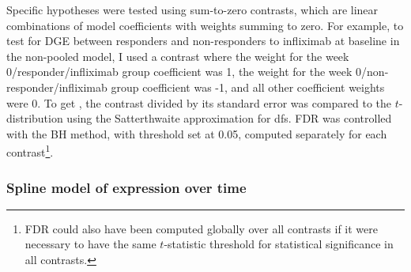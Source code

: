 Specific hypotheses were tested using sum-to-zero contrasts, which are linear combinations of model coefficients with weights summing to zero.
For example, 
to test for \gls{DGE} between responders and non-responders to infliximab at baseline in the non-pooled model,
I used a contrast where
the weight for the week 0/responder/infliximab group coefficient was 1,
the weight for the week 0/non-responder/infliximab group coefficient was -1,
and all other coefficient weights were 0.
%
%
% 
To get \pvalues{}, the contrast divided by its standard error was compared to the $t$-distribution using the Satterthwaite approximation for \glspl{df}.
\Gls{FDR} was controlled with the \gls{BH} method, with threshold set at 0.05, computed separately for each contrast\footnote{\Gls{FDR} could also have been computed globally over all contrasts if it were necessary to have the same $t$-statistic threshold for statistical significance in all contrasts.}.


\subsubsection{Spline model of expression over time}

